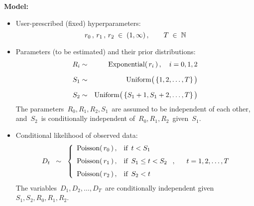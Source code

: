 \vskip 0.5cm
\noindent
\textbf{Model:}
\begin{itemize}
\item
	User-prescribed (fixed) hyperparameters:
	\begin{equation*}
	r_{0}\,,\, r_{1}\,,\, r_{2} \; \in \; (1,\infty)\,,
	\quad\quad
	T \; \in \; \mathbb{N}
	\end{equation*}
\item
	Parameters (to be estimated) and their prior distributions:
	\begin{eqnarray*}
	R_{i} & \sim & \textnormal{Exponential}(\,r_{i}\,)\,,\quad i = 0, 1, 2
	\\
	\overset{{\color{white}1}}{S_{1}} & \sim & \textnormal{Uniform}\!\left(\,\{1,2,\overset{{\color{white}1}}{\ldots}\,,T\}\,\right)
	\\
	\overset{{\color{white}1}}{S_{2}} & \sim & \textnormal{Uniform}\!\left(\,\{S_{1}+1,S_{1}+2,\overset{{\color{white}1}}{\ldots}\,,T\}\,\right)
	\end{eqnarray*}
	The parameters \,$R_{0},R_{1},R_{2},S_{1}$\, are assumed to be independent of each other, and
	\,$S_{2}$\, is conditionally independent of \,$R_{0},R_{1},R_{2}$\, given \,$S_{1}$.
\item
	Conditional likelihood of observed data:
	\begin{equation*}
	D_{t}
	\;\; \sim \;\;
		\left\{\begin{array}{cl}
		\textnormal{Poisson}(\,r_{0}\,)\,, & \textnormal{if \,$t < S_{1}$}
		\\
		\overset{{\color{white}1}}{\textnormal{Poisson}(\,r_{1}\,)}\,, & \textnormal{if \,$S_{1} \leq t < S_{2}$}
		\\
		\overset{{\color{white}1}}{\textnormal{Poisson}(\,r_{2}\,)}\,, & \textnormal{if \,$S_{2} < t$}
		\end{array}\right.,
	\quad\;\;
	t = 1, 2, \ldots, T
	\end{equation*}
	The variables \,$D_{1}, D_{2}, \ldots, D_{T}$\, are conditionally independent given \,$S_{1},S_{2},R_{0},R_{1},R_{2}$.
\end{itemize}


